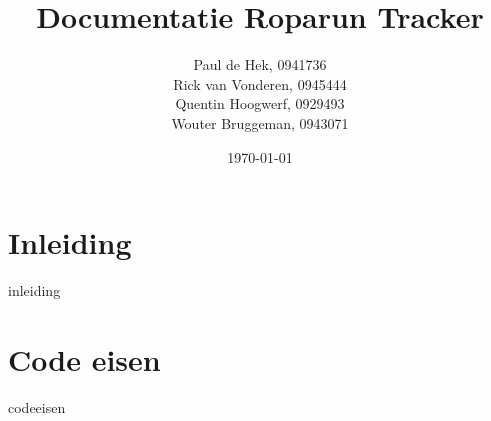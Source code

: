 \documentclass[12pt, a4paper]{article}
\date{\today}
\title{\textbf{Documentatie Roparun Tracker}}
\author{
	Paul de Hek, 0941736 \\
	Rick van Vonderen, 0945444 \\
	Quentin Hoogwerf, 0929493 \\
	Wouter Bruggeman, 0943071 \\
}
\begin{document}
	\maketitle
	\thispagestyle{empty}
	\newpage

	\tableofcontents
	\setcounter{page}{1}
	\newpage

	\section{Inleiding}
	{inleiding}
	\newpage

	\section{Code eisen}
	{codeeisen}
	\newpage
\end{document}

